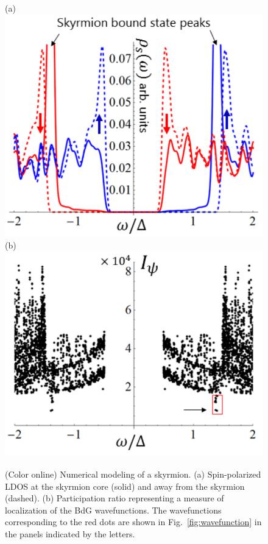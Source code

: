 \documentclass[twocolumn,showpacs,floatfix,longbibliography]{revtex4-1}
\begin{document}
\begin{figure} \centering
	(a)\includegraphics[width=0.7\linewidth]{fig3a} \\  
	(b)\includegraphics[width=0.7\linewidth]{fig3b} 
	\caption{(Color online) Numerical modeling of a skyrmion. (a) Spin-polarized LDOS at the skyrmion core (solid) and away from the skyrmion (dashed).  (b) Participation ratio representing a measure of localization of  the BdG wavefunctions. The wavefunctions corresponding to the red dots are shown in Fig.~\ref{fig:wavefunction} in the panels indicated by the letters.} \label{fig:LDOSNumerics}
\end{figure}


\end{document}
